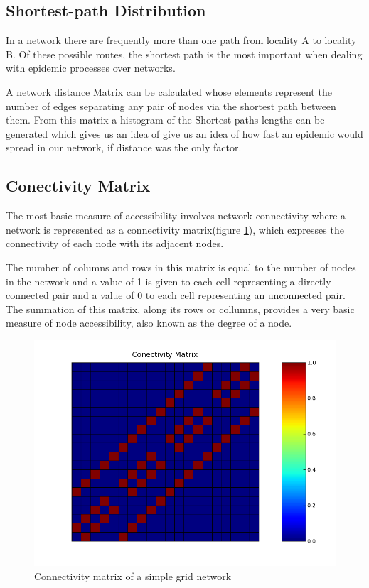 	\subsection{Shortest-path Distribution}
	In a network there are frequently more than one path from locality A to locality B. Of these possible  routes, the shortest path is the most important when dealing with epidemic processes over networks.
	
        A network distance Matrix can be calculated whose elements represent the number of edges separating any pair of nodes via the shortest path between them. From this matrix a histogram of the Shortest-paths lengths can be generated which gives us an idea of give us an idea of how fast an epidemic would spread in our network, if distance was the only factor.
        
        
        \subsection{Conectivity Matrix}
        The most basic measure of accessibility involves network connectivity
        where a network is represented as a connectivity matrix(figure \ref{fig:cm}), which 
        expresses the connectivity of each node with its adjacent nodes. 
        
        The number of columns and rows in this matrix is equal to the number 
        of nodes in the network and a value of 1 is given to each cell representing a directly connected pair and a value of 0 to each cell representing an unconnected pair. The summation of this matrix, along its rows or collumns, provides a very 
        basic measure of node accessibility, also known as the degree of a node.
        \begin{figure}[h]
        \includegraphics[scale=0.6]{cm.png}
        \centering
        \caption{Connectivity matrix of a simple grid network}
        \label{fig:cm}
        \end{figure}
        

